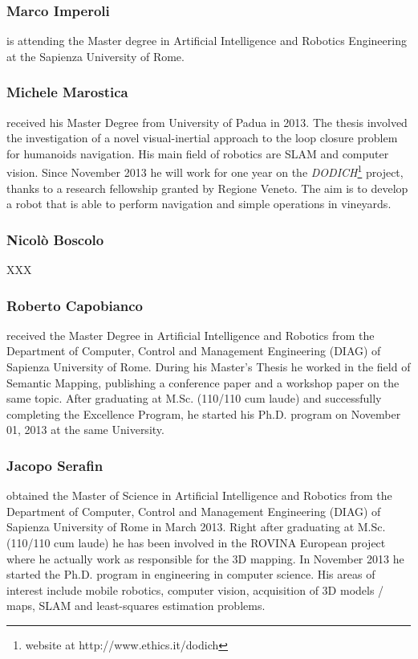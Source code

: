 \documentclass[conference]{IEEEtran}
\begin{document}
\subsubsection{Marco Imperoli}
is attending the Master degree in Artificial Intelligence and Robotics Engineering at the Sapienza University of Rome.
\subsubsection{Michele Marostica}
received his Master Degree from University of Padua in 2013. The thesis involved the investigation of a novel visual-inertial approach to the loop closure problem for humanoids navigation. His main field of robotics are SLAM and computer vision.
Since November 2013 he will work for one year on the \textit{DODICH}\footnote{website at http://www.ethics.it/dodich} project, thanks to a research fellowship granted by Regione Veneto.
The aim is to develop a robot that is able to perform navigation and simple operations in vineyards.
\subsubsection{Nicolò Boscolo}
XXX
\subsubsection{Roberto Capobianco}
received the Master Degree in Artificial Intelligence and Robotics from the Department of Computer, 
Control and Management Engineering (DIAG) of Sapienza University of Rome. During his Master's Thesis he worked in the field of Semantic Mapping, publishing a conference paper and a workshop paper on the same topic. After graduating at M.Sc. (110/110 cum laude) and successfully completing the Excellence Program, he started his Ph.D. program on November 01, 2013 at the same University. 
\subsubsection{Jacopo Serafin}
obtained the Master of Science in Artificial Intelligence and Robotics from the Department of Computer, Control and Management Engineering (DIAG) of Sapienza University of Rome in March 2013. Right after graduating at M.Sc.(110/110 cum laude) he has been involved in the ROVINA European project where he actually work as responsible for the 3D mapping. In November 2013 he started the Ph.D. program in engineering in computer science. His areas of interest include mobile robotics, computer vision, acquisition of 3D models / maps, SLAM and least-squares estimation problems.
\end{document}
